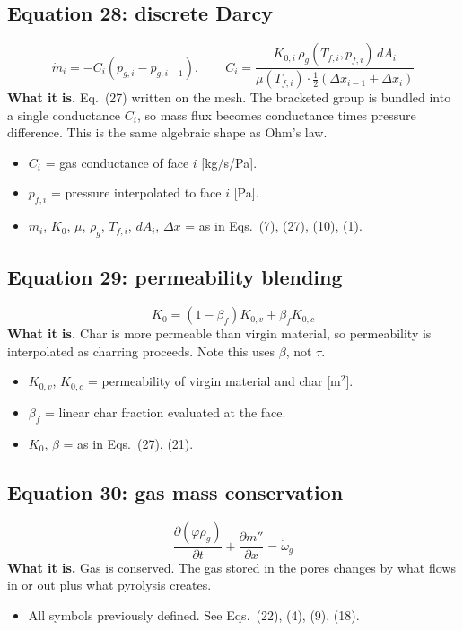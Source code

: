 \documentclass[11pt]{article}
\begin{document}
\subsection*{Equation 28: discrete Darcy}
\begin{equation}
\dot m_i = -C_i \left(p_{g,i} - p_{g,i-1}\right),
\qquad
C_i = \frac{K_{0,i}\, \rho_g(T_{f,i}, p_{f,i})\, dA_i}
{\mu(T_{f,i}) \cdot \tfrac12\left(\Delta x_{i-1} + \Delta x_i\right)}
\end{equation}
\textbf{What it is.} Eq.~(27) written on the mesh. The bracketed group is bundled
into a single conductance $C_i$, so mass flux becomes conductance times pressure
difference. This is the same algebraic shape as Ohm's law.
\begin{itemize}
  \item $C_i$ = gas conductance of face $i$ [kg/s/Pa].
  \item $p_{f,i}$ = pressure interpolated to face $i$ [Pa].
  \item $\dot m_i$, $K_0$, $\mu$, $\rho_g$, $T_{f,i}$, $dA_i$, $\Delta x$ = as in
        Eqs.~(7), (27), (10), (1).
\end{itemize}

\subsection*{Equation 29: permeability blending}
\begin{equation}
K_0 = (1 - \beta_f) K_{0,v} + \beta_f K_{0,c}
\end{equation}
\textbf{What it is.} Char is more permeable than virgin material, so permeability
is interpolated as charring proceeds. Note this uses $\beta$, not $\tau$.
\begin{itemize}
  \item $K_{0,v}$, $K_{0,c}$ = permeability of virgin material and char [m$^2$].
  \item $\beta_f$ = linear char fraction evaluated at the face.
  \item $K_0$, $\beta$ = as in Eqs.~(27), (21).
\end{itemize}

\subsection*{Equation 30: gas mass conservation}
\begin{equation}
\frac{\partial (\varphi \rho_g)}{\partial t} + \frac{\partial \dot m''}{\partial x}
= \dot\omega_g
\end{equation}
\textbf{What it is.} Gas is conserved. The gas stored in the pores changes by
what flows in or out plus what pyrolysis creates.
\begin{itemize}
  \item All symbols previously defined. See Eqs.~(22), (4), (9), (18).
\end{itemize}
\end{document}
